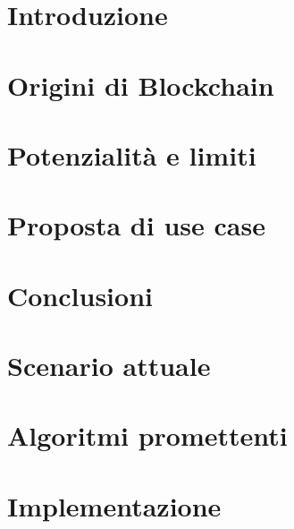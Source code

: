 \documentclass[12pt,twoside]{report}
\begin{document}






\tableofcontents
\listoffigures

\chapter{Introduzione}


\chapter{Origini di Blockchain}


\chapter{Potenzialità e limiti}


\chapter{Proposta di use case}


\chapter{Conclusioni}


\appendix
\chapter{Scenario attuale}


\chapter{Algoritmi promettenti}


\chapter{Implementazione}


{}

\end{document}
